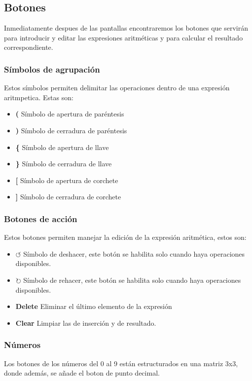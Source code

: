 \documentclass[a4paper,12pt]{article}
\begin{document}
\subsection{Botones}
Inmediatamente despues de las pantallas encontraremos los botones que servirán para introducir y editar las expresiones aritméticas y para calcular el resultado correspondiente. 
\subsubsection{Símbolos de agrupación}
Estos símbolos permiten delimitar las operaciones dentro de una expresión aritmpetica. Estas son: 

\begin{itemize}
    \item \textbf{(} Símbolo de apertura de paréntesis
    \item \textbf{)} Símbolo de cerradura de paréntesis
    \item \textbf{\{} Símbolo de apertura de llave 
    \item \textbf{\}} Símbolo de cerradura de llave
    \item \textbf{[} Símbolo de apertura de corchete
    \item \textbf{]} Símbolo de cerradura de corchete
\end{itemize}
\subsubsection{Botones de acción}
Estos botones permiten manejar la edición de la expresión aritmética, estos son:
\begin{itemize}
    \item \textbf{$\circlearrowleft$} Símbolo de deshacer, este botón se habilita solo cuando haya operaciones disponibles.
    \item \textbf{$\circlearrowright$} Símbolo de rehacer, este botón se habilita solo cuando haya operaciones disponibles.
    \item \textbf{Delete} Eliminar el último elemento de la expresión
    \item \textbf{Clear} Limpiar las de inserción y de resultado.
\end{itemize}

\subsubsection{Números}
Los botones de los números del 0 al 9 están estructurados en una matriz 3x3, donde además, se añade el boton de punto decimal.
\end{document}
